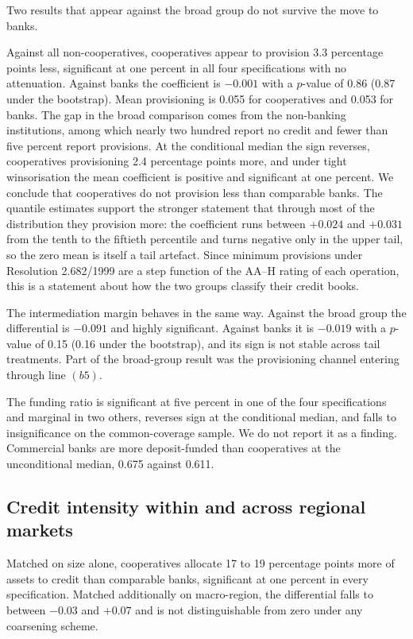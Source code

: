 \documentclass[11pt,a4paper]{article}
\begin{document}
Two results that appear against the broad group do not survive the move to banks.

Against all non-cooperatives, cooperatives appear to provision 3.3 percentage points
less, significant at one percent in all four specifications with no attenuation. Against
banks the coefficient is $-0.001$ with a $p$-value of 0.86 (0.87 under the bootstrap).
Mean provisioning is 0.055 for cooperatives and 0.053 for banks. The gap in the broad
comparison comes from the non-banking institutions, among which nearly two hundred report
no credit and fewer than five percent report provisions. At the conditional median the
sign reverses, cooperatives provisioning 2.4 percentage points more, and under tight
winsorisation the mean coefficient is positive and significant at one percent. We
conclude that cooperatives do not provision less than comparable banks. The quantile
estimates support the stronger statement that through most of the distribution they
provision more: the coefficient runs between $+0.024$ and $+0.031$ from the tenth to the
fiftieth percentile and turns negative only in the upper tail, so the zero mean is itself
a tail artefact. Since minimum provisions under Resolution 2.682/1999 are a step function
of the AA--H rating of each operation, this is a statement about how the two groups
classify their credit books.

The intermediation margin behaves in the same way. Against the broad group the
differential is $-0.091$ and highly significant. Against banks it is $-0.019$ with a
$p$-value of 0.15 (0.16 under the bootstrap), and its sign is not stable across tail
treatments. Part of the broad-group result was the provisioning channel entering through
line $(b5)$.

The funding ratio is significant at five percent in one of the four specifications and
marginal in two others, reverses sign at the conditional median, and falls to
insignificance on the common-coverage sample. We do not report it as a finding.
Commercial banks are more deposit-funded than cooperatives at the unconditional median,
0.675 against 0.611.

\subsection{Credit intensity within and across regional markets}

Matched on size alone, cooperatives allocate 17 to 19 percentage points more of assets
to credit than comparable banks, significant at one percent in every specification.
Matched additionally on macro-region, the differential falls to between $-0.03$ and
$+0.07$ and is not distinguishable from zero under any coarsening scheme.
\end{document}
